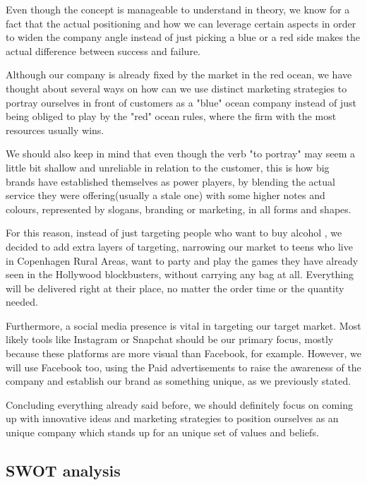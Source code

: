\documentclass[12p]{article}
\begin{document}
Even though the concept is manageable to understand in theory, we know for a fact that the actual positioning and how we can leverage certain aspects in order to widen the company angle instead of just picking a blue or a red side makes the actual difference between success and failure.

Although our company is already fixed by the market in the red ocean, we have thought about several ways on how can we use distinct marketing strategies to portray ourselves in front of customers as a "blue" ocean company instead of just being obliged to play by the "red" ocean rules, where the firm with the most resources usually wins.

We should also keep in mind that even though the verb "to portray" may seem a little bit shallow and unreliable in relation to the customer, this is how big brands have established themselves as power players, by blending the actual service they were offering(usually a stale one) with some higher notes and colours, represented by slogans, branding or marketing, in all forms and shapes.

For this reason, instead of just targeting people who want to buy alcohol , we decided to add extra layers of targeting, narrowing our market to teens who live in Copenhagen Rural Areas, want to party and play the games they have already seen in the Hollywood blockbusters, without carrying any bag at all. Everything will be delivered right at their place, no matter the order time or the quantity needed.

Furthermore, a social media presence is vital in targeting our target market. Most likely tools like Instagram or Snapchat should be our primary focus, mostly because these platforms are more visual than Facebook, for example. However, we will use Facebook too, using the Paid advertisements to raise the awareness of the company and establish our brand as something unique, as we previously stated. 

Concluding everything already said before, we should definitely focus on coming up with innovative ideas and marketing strategies to position ourselves as an unique company which stands up for an unique set of values and beliefs.


\subsection{SWOT analysis} \label{SWOT}
\end{document}
